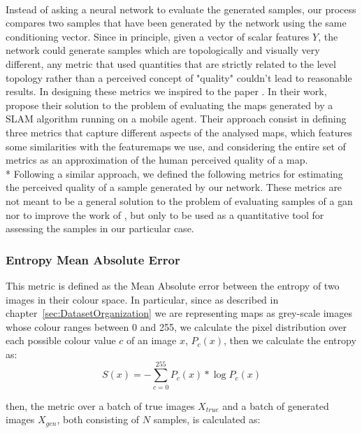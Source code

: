 \paragraph{} Instead of asking a neural network to evaluate the generated samples, our process compares two samples that have been generated by the network using the same conditioning vector. Since in principle, given a vector of scalar features $Y$, the network could generate samples which are topologically and visually very different, any metric that used quantities that are strictly related to the level topology rather than a perceived concept of "quality" couldn't lead to reasonable results. In designing these metrics we inspired to the paper . In their work, \citeauthor{slam} propose their solution to the problem of evaluating the maps generated by a SLAM algorithm running on a mobile agent. Their approach consist in defining three metrics that capture different aspects of the analysed maps, which features some similarities with the \glspl{featuremap} we use, and considering the entire set of metrics as an approximation of the human perceived quality of a map. 
\\* Following a similar approach, we defined the following metrics for estimating the perceived quality of a sample generated by our network. These metrics are not meant to be a general solution to the problem of evaluating samples of a \gls{gan} nor to improve the work of \citeauthor{slam_metrics}, but only to be used as a quantitative tool for assessing the samples in our particular case.

\subsubsection{Entropy Mean Absolute Error}
This metric is defined as the Mean Absolute error between the entropy of two images in their colour space. In particular, since as described in chapter~\ref{sec:DatasetOrganization} we are representing maps as grey-scale images whose colour ranges between 0 and 255, we calculate the pixel distribution over each possible colour value $c$ of an image $x$, $P_{c}(x)$, then we calculate the entropy as:
\begin{equation}
S(x) = - \sum_{c=0}^{255}{ P_{c}(x) * \log{P_{c}(x)} }
\end{equation}

then, the metric over a batch of true images $X_{true}$ and a batch of generated images $X_{gen}$, both consisting of $N$ samples, is calculated as:

